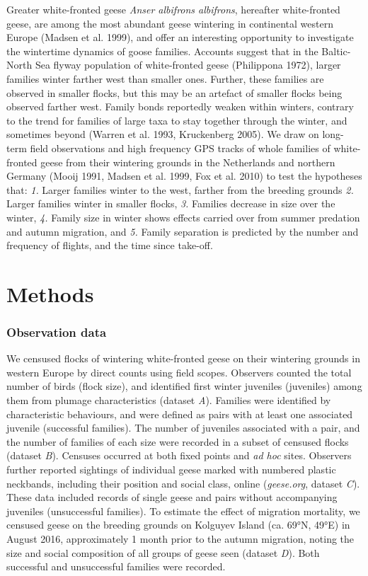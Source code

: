 \documentclass[10pt,twocolumn]{paper}
\begin{document}
Greater white-fronted geese \emph{Anser albifrons albifrons}, hereafter
white-fronted geese, are among the most abundant geese wintering in
continental western Europe (Madsen et al. 1999), and offer an
interesting opportunity to investigate the wintertime dynamics of goose
families. Accounts suggest that in the Baltic-North Sea flyway
population of white-fronted geese (Philippona 1972), larger families
winter farther west than smaller ones. Further, these families are
observed in smaller flocks, but this may be an artefact of smaller
flocks being observed farther west. Family bonds reportedly weaken
within winters, contrary to the trend for families of large taxa to stay
together through the winter, and sometimes beyond (Warren et al. 1993,
Kruckenberg 2005). We draw on long-term field observations and high
frequency GPS tracks of whole families of white-fronted geese from their
wintering grounds in the Netherlands and northern Germany (Mooij 1991,
Madsen et al. 1999, Fox et al. 2010) to test the hypotheses that:
\emph{1.} Larger families winter to the west, farther from the breeding
grounds \emph{2.} Larger families winter in smaller flocks, \emph{3.}
Families decrease in size over the winter, \emph{4.} Family size in
winter shows effects carried over from summer predation and autumn
migration, and \emph{5.} Family separation is predicted by the number
and frequency of flights, and the time since take-off.

\section{Methods}\label{methods}

\subsubsection{Observation data}\label{observation-data}

We censused flocks of wintering white-fronted geese on their wintering
grounds in western Europe by direct counts using field scopes. Observers
counted the total number of birds (flock size), and identified first
winter juveniles (juveniles) among them from plumage characteristics
(dataset \emph{A}). Families were identified by characteristic
behaviours, and were defined as pairs with at least one associated
juvenile (successful families). The number of juveniles associated with
a pair, and the number of families of each size were recorded in a
subset of censused flocks (dataset \emph{B}). Censuses occurred at both
fixed points and \emph{ad hoc} sites. Observers further reported
sightings of individual geese marked with numbered plastic neckbands,
including their position and social class, online (\emph{geese.org},
dataset \emph{C}). These data included records of single geese and pairs
without accompanying juveniles (unsuccessful families). To estimate the
effect of migration mortality, we censused geese on the breeding grounds
on Kolguyev Island (ca. 69°N, 49°E) in August 2016, approximately 1
month prior to the autumn migration, noting the size and social
composition of all groups of geese seen (dataset \emph{D}). Both
successful and unsuccessful families were recorded.
\end{document}
